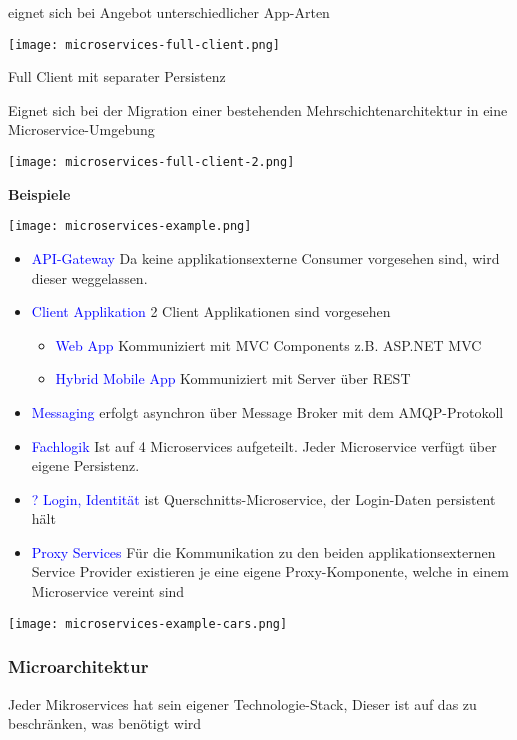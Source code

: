 eignet sich bei Angebot unterschiedlicher App-Arten

\texttt{[image: microservices-full-client.png]}

Full Client mit separater Persistenz

Eignet sich bei der Migration einer bestehenden Mehrschichtenarchitektur in eine Microservice-Umgebung

\texttt{[image: microservices-full-client-2.png]}

\textbf{Beispiele}

\texttt{[image: microservices-example.png]}

\begin{itemize}
    \item \textcolor{blue}{API-Gateway} Da keine applikationsexterne Consumer vorgesehen sind, wird dieser weggelassen.
    \item \textcolor{blue}{Client Applikation} 2 Client Applikationen sind vorgesehen
    \begin{itemize}
        \item \textcolor{blue}{Web App} Kommuniziert mit MVC Components z.B. ASP.NET MVC
        \item \textcolor{blue}{Hybrid Mobile App} Kommuniziert mit Server über REST
    \end{itemize}
    \item \textcolor{blue}{Messaging} erfolgt asynchron über Message Broker mit dem AMQP-Protokoll
    \item \textcolor{blue}{Fachlogik} Ist auf 4 Microservices aufgeteilt. Jeder Microservice verfügt über eigene Persistenz.
    \item \textcolor{blue}{? Login, Identität} ist Querschnitts-Microservice, der Login-Daten persistent hält
    \item \textcolor{blue}{Proxy Services} Für die Kommunikation zu den beiden applikationsexternen Service Provider existieren je eine eigene Proxy-Komponente, welche in einem Microservice vereint sind
\end{itemize}
\vspace{10pt}
\texttt{[image: microservices-example-cars.png]}

\columnbreak
\subsubsection{Microarchitektur}

Jeder Mikroservices hat sein eigener Technologie-Stack, Dieser ist auf das zu beschränken, was benötigt wird

